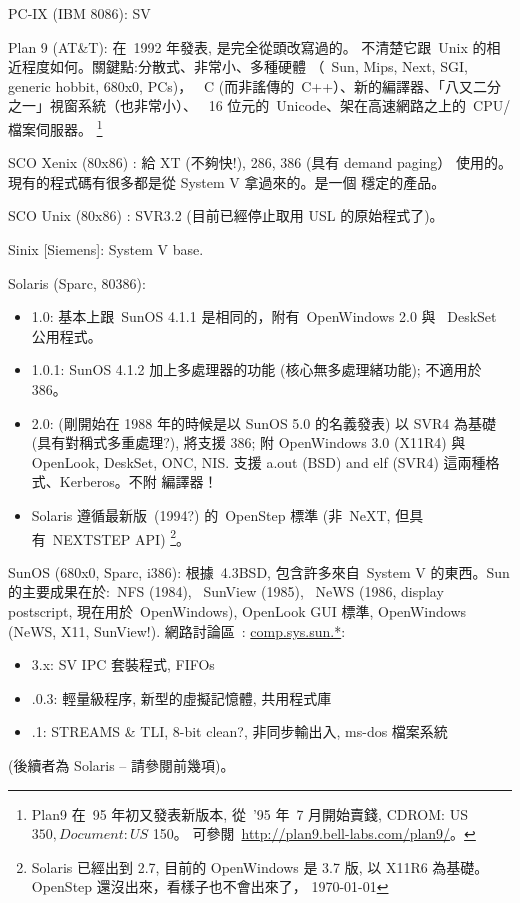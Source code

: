 \documentclass{article}
\begin{document}
\begin{CJK*}{Bg5}{ming}
     \item [PC-IX] (IBM 8086):  SV

      \item [Plan 9] (AT\&T): 在~1992 年發表, 是完全從頭改寫過的。
      不清楚它跟~Unix 的相近程度如何。關鍵點:分散式、非常小、多種硬體
      （~Sun, Mips, Next, SGI, generic hobbit, 680x0, PCs)，
      ~C (而非謠傳的~C++）、新的編譯器、「八又二分之一」視窗系統（也非常小）、
      ~16 位元的~Unicode、架在高速網路之上的~CPU/檔案伺服器。
        \footnote{Plan9 在~95 年初又發表新版本, 從~'95 年~7 月開始賣錢,
                 CDROM: US$ 350, Document: US$ 150。
		 可參閱~\url{http://plan9.bell-labs.com/plan9/}。}

      \item [SCO Xenix (80x86)]: 給 XT (不夠快!), 286, 386 (具有 demand paging）
         使用的。現有的程式碼有很多都是從 System V 拿過來的。是一個
         穩定的產品。

      \item [SCO Unix (80x86)]:  SVR3.2 (目前已經停止取用 USL 的原始程式了)。

      \item [Sinix] [Siemens]: System V base.

      \item [Solaris] (Sparc, 80386):
	\begin{itemize}
         \item 1.0:  基本上跟~SunOS 4.1.1 是相同的，附有~OpenWindows 2.0 與
           ~DeskSet 公用程式。
         \item 1.0.1:  SunOS 4.1.2 加上多處理器的功能 (核心無多處理緒功能);
           不適用於 386。
         \item 2.0: (剛開始在 1988 年的時候是以 SunOS 5.0 的名義發表) 以 SVR4
           為基礎(具有對稱式多重處理?), 將支援 386; 附
           OpenWindows 3.0 (X11R4) 與 OpenLook, DeskSet, ONC, NIS.
           支援 a.out (BSD) and elf (SVR4) 這兩種格式、Kerberos。不附
           編譯器！
         \item Solaris 遵循最新版~(1994?) 的~OpenStep 標準
          (非~NeXT, 但具有~NEXTSTEP API)
          \footnote{Solaris 已經出到 2.7, 目前的 OpenWindows 是 3.7 版,
	         以 X11R6 為基礎。OpenStep 還沒出來，看樣子也不會出來了，
		\today}。
	\end{itemize}

      \item [SunOS] (680x0, Sparc, i386):  根據~4.3BSD, 包含許多來自~System V 
	的東西。Sun 的主要成果在於:~NFS (1984), ~SunView (1985), ~NeWS
         (1986, display postscript, 現在用於~OpenWindows), OpenLook GUI 標準,
         OpenWindows (NeWS, X11, SunView!).  網路討論區~: \url{comp.sys.sun.*}:
	\begin{itemize}
         \item 3.x:  SV IPC 套裝程式, FIFOs
         \item.0.3: 輕量級程序, 新型的虛擬記憶體, 共用程式庫
         \item.1: STREAMS \& TLI, 8-bit clean?, 非同步輸出入, ms-dos 檔案系統
	\end{itemize}
         (後續者為 Solaris -- 請參閱前幾項)。


\end{CJK*}
\end{document}
